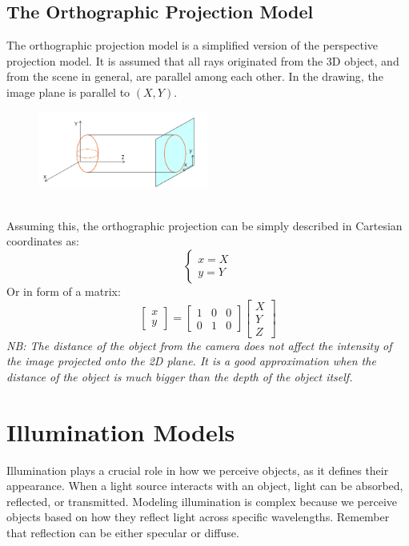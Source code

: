 \subsection{The Orthographic Projection Model}
The orthographic projection model is a simplified version of the perspective projection model. It is assumed that all rays originated from the 3D object, and from the scene in general, are parallel among each other. 
In the drawing, the image plane is parallel to $(X,Y)$.
\begin{figure}[h]
    \centering
    \includegraphics[width=0.5\textwidth]{Figures/Orthographic_proj.png}
\end{figure}
\\Assuming this, the orthographic projection
can be simply described in Cartesian coordinates as:
\[
    \begin{cases}
        x = X \\
        y = Y
    \end{cases}
\]
Or in form of a matrix:
\[
    \begin{bmatrix}
        x \\
        y
    \end{bmatrix} = \begin{bmatrix}
        1 & 0 & 0 \\
        0 & 1 & 0
    \end{bmatrix} \begin{bmatrix}
        X \\
        Y \\
        Z
    \end{bmatrix}   
\]
\textit{NB: The distance of the object from the camera does not affect the intensity of the image projected onto the 2D plane.
It is a good approximation when the distance of the object is much bigger than the depth of the object itself. }

\section{Illumination Models}
Illumination plays a crucial role in how we perceive objects, as it defines their appearance. 
When a light source interacts with an object, light can be absorbed, reflected, or transmitted. 
Modeling illumination is complex because we perceive objects based on how they reflect light across specific wavelengths. 
Remember that reflection can be either specular or diffuse.

